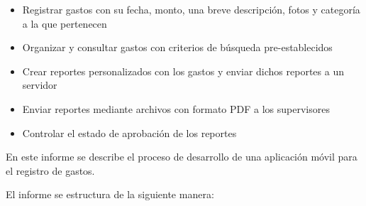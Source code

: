 \begin{itemize}
\item Registrar gastos con su fecha, monto, una breve descripción, fotos y categoría a la que pertenecen
\item Organizar y consultar gastos con criterios de búsqueda pre-establecidos
\item Crear reportes personalizados con los gastos y enviar dichos reportes a un servidor
\item Enviar reportes mediante archivos con formato PDF a los supervisores
\item Controlar el estado de aprobación de los reportes
\end{itemize}

En este informe se describe el proceso de desarrollo de una aplicación móvil para el registro de gastos.

El informe se estructura de la siguiente manera: 